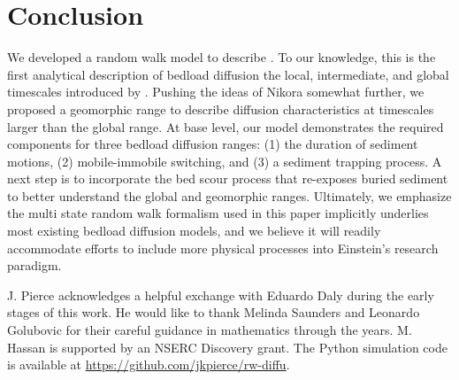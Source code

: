 \documentclass[draft,grl]{agujournal2018}
\begin{document}
\section{Conclusion}
\label{sec:conclusion}
We developed a random walk model to describe .
To our knowledge, this is the first analytical description of bedload diffusion  the local, intermediate, and global timescales introduced by \citet{Nikora2001a}.
Pushing the ideas of Nikora somewhat further, we proposed a geomorphic range to describe diffusion characteristics at timescales larger than the global range.
At base level, our model demonstrates the required components for three bedload diffusion ranges: (1) the duration of sediment motions, (2) mobile-immobile switching, and (3) a sediment trapping process.
A next step is to incorporate the bed scour process that re-exposes buried sediment to better understand the global and geomorphic ranges.
Ultimately, we emphasize the multi state random walk formalism used in this paper implicitly underlies most existing bedload diffusion models, and we believe it will readily accommodate efforts to include more physical processes into Einstein's research paradigm.

\appendix


\acknowledgments
J. Pierce acknowledges a helpful exchange with Eduardo Daly during the early stages of this work. He would like to thank Melinda Saunders and Leonardo Golubovic for their careful guidance in mathematics through the years. M. Hassan is supported by an NSERC Discovery grant. The Python simulation code is available at \sloppy
\url{https://github.com/jkpierce/rw-diffu}.


\end{document}
